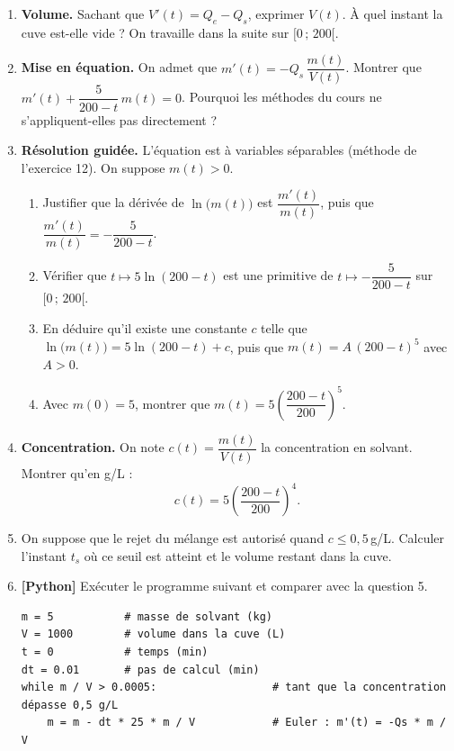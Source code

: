 \documentclass[a4paper,11pt]{article}
\newcommand{\rep}[1]{\par\noindent\begin{minipage}[t][#1cm]{\linewidth}\mbox{}\end{minipage}\par}
\newcommand{\py}{{\color{uimmred}\small\bfseries[Python]}}
\begin{document}
\begin{enumerate}
  \needspace{4.6cm}
  \item \textbf{Volume.} Sachant que $V'(t) = Q_e - Q_s$, exprimer $V(t)$. À quel instant la cuve est-elle vide ? On travaille dans la suite sur $[0\,;\,200[$.
  \rep{2.5}
  \needspace{5.6cm}
  \item \textbf{Mise en équation.} On admet que $m'(t) = -Q_s\,\dfrac{m(t)}{V(t)}$. Montrer que $m'(t) + \dfrac{5}{200 - t}\,m(t) = 0$. Pourquoi les méthodes du cours ne s'appliquent-elles pas directement ?
  \rep{3}
  \item \textbf{Résolution guidée.} L'équation est à variables séparables (méthode de l'exercice 12). On suppose $m(t) > 0$.
  \begin{enumerate}
    \needspace{4.6cm}
    \item Justifier que la dérivée de $\ln\big(m(t)\big)$ est $\dfrac{m'(t)}{m(t)}$, puis que $\dfrac{m'(t)}{m(t)} = -\dfrac{5}{200 - t}$.
    \rep{2.5}
    \needspace{4.1cm}
    \item Vérifier que $t \mapsto 5\ln(200 - t)$ est une primitive de $t \mapsto -\dfrac{5}{200 - t}$ sur $[0\,;\,200[$.
    \rep{2}
    \needspace{4.6cm}
    \item En déduire qu'il existe une constante $c$ telle que $\ln\big(m(t)\big) = 5\ln(200 - t) + c$, puis que $m(t) = A\,(200 - t)^5$ avec $A > 0$.
    \rep{2.5}
    \needspace{3.6cm}
    \item Avec $m(0) = 5$, montrer que $m(t) = 5\left(\dfrac{200 - t}{200}\right)^5$.
    \rep{2}
  \end{enumerate}
  \needspace{5.6cm}
  \item \textbf{Concentration.} On note $c(t) = \dfrac{m(t)}{V(t)}$ la concentration en solvant. Montrer qu'en g/L :
  \[ c(t) = 5\left(\frac{200 - t}{200}\right)^4 . \]
  \rep{3}
  \needspace{5.1cm}
  \item On suppose que le rejet du mélange est autorisé quand $c \leq 0{,}5$\,g/L. Calculer l'instant $t_s$ où ce seuil est atteint et le volume restant dans la cuve.
  \rep{3}
  \needspace{7.7cm}
  \item \py{} Exécuter le programme suivant et comparer avec la question 5.
\begin{lstlisting}[style=uimmpython]
m = 5           # masse de solvant (kg)
V = 1000        # volume dans la cuve (L)
t = 0           # temps (min)
dt = 0.01       # pas de calcul (min)
while m / V > 0.0005:                  # tant que la concentration dépasse 0,5 g/L
    m = m - dt * 25 * m / V            # Euler : m'(t) = -Qs * m / V

\end{lstlisting}
\end{enumerate}
\end{document}
